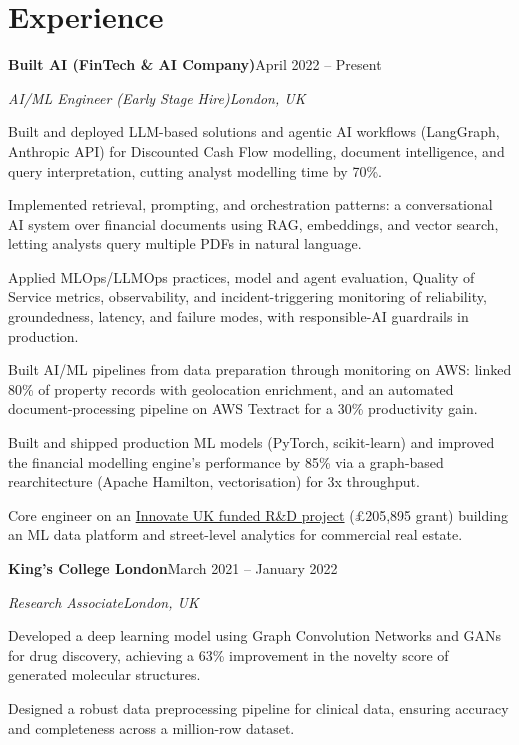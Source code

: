 \documentclass[10pt,a4paper]{article}
\newcommand{\entry}[4]{%
  {\color{company}\bfseries #1}\hfill {\color{muted}#2}\par
  \vspace{1pt}
  {\itshape #3}\hfill {\color{muted}\itshape #4}\par
  \vspace{3pt}%
}
\begin{document}
\section{Experience}
\entry{Built AI (FinTech \& AI Company)}{April 2022 -- Present}{AI/ML Engineer (Early Stage Hire)}{London, UK}
\begin{tight}
  \item Built and deployed LLM-based solutions and agentic AI workflows (LangGraph, Anthropic API) for Discounted Cash Flow modelling, document intelligence, and query interpretation, cutting analyst modelling time by 70\%.
  \item Implemented retrieval, prompting, and orchestration patterns: a conversational AI system over financial documents using RAG, embeddings, and vector search, letting analysts query multiple PDFs in natural language.
  \item Applied MLOps/LLMOps practices, model and agent evaluation, Quality of Service metrics, observability, and incident-triggering monitoring of reliability, groundedness, latency, and failure modes, with responsible-AI guardrails in production.
  \item Built AI/ML pipelines from data preparation through monitoring on AWS: linked 80\% of property records with geolocation enrichment, and an automated document-processing pipeline on AWS Textract for a 30\% productivity gain.
  \item Built and shipped production ML models (PyTorch, scikit-learn) and improved the financial modelling engine's performance by 85\% via a graph-based rearchitecture (Apache Hamilton, vectorisation) for 3x throughput.
  \item Core engineer on an \href{https://gtr.ukri.org/projects?ref=10022996}{Innovate UK funded R\&D project} (\pounds205,895 grant) building an ML data platform and street-level analytics for commercial real estate.
\end{tight}

\entry{King's College London}{March 2021 -- January 2022}{Research Associate}{London, UK}
\begin{tight}
  \item Developed a deep learning model using Graph Convolution Networks and GANs for drug discovery, achieving a 63\% improvement in the novelty score of generated molecular structures.
  \item Designed a robust data preprocessing pipeline for clinical data, ensuring accuracy and completeness across a million-row dataset.
\end{tight}
\end{document}

